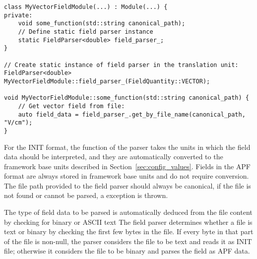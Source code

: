 \begin{verbatim}
class MyVectorFieldModule(...) : Module(...) {
private:
    void some_function(std::string canonical_path);
    // Define static field parser instance
    static FieldParser<double> field_parser_;
}

// Create static instance of field parser in the translation unit:
FieldParser<double> MyVectorFieldModule::field_parser_(FieldQuantity::VECTOR);

void MyVectorFieldModule::some_function(std::string canonical_path) {
    // Get vector field from file:
    auto field_data = field_parser_.get_by_file_name(canonical_path, "V/cm");
}
\end{verbatim}

For the INIT format, the  function of the parser takes the units in which the field data should be interpreted, and they are automatically converted to the framework base units described in Section~\ref{sec:config_values}. Fields in the APF format are always stored in framework base units and do not require conversion.
The file path provided to the field parser should always be canonical, if the file is not found or cannot be parsed, a  exception is thrown.

The type of field data to be parsed is automatically deduced from the file content by checking for binary or ASCII text
The field parser determines whether a file is text or binary by checking the first few bytes in the file.
If every byte in that part of the file is non-null, the parser considers the file to be text and reads it as INIT file; otherwise it considers the file to be binary and parses the field as APF data.

\label{sec:tcad_electric_field_converter}

\label{sec:root_analysis_macros}
